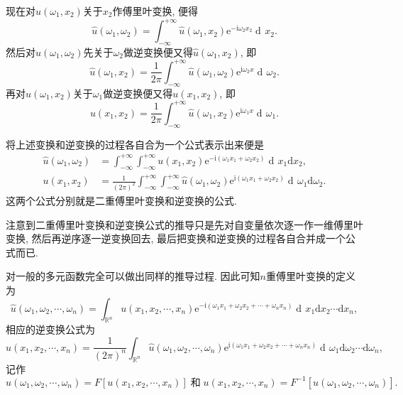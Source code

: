 \documentclass[aspectratio=169,notheorems,12pt,compress,UTF8]{ctexbeamer} %
\DeclareMathOperator\dif{d\!}
\def\R {\mathbb {R}}
\def\disp{\displaystyle}
\newcommand{\me}{\mathrm{e}}
\newcommand{\mi}{\mathrm{i}}
\newcommand{\spb}{\vspace{3mm}}
\begin{document}
\begin{frame}
现在对$\widehat{u}(\omega_1,x_2)$关于$x_2$作傅里叶变换, 便得
$$
\widehat{u}(\omega_1,\omega_2)=\int_{-\infty}^{+\infty}\widehat{u}(\omega_1,x_2)\me^{-\mi\omega_2x_2}\dif x_2.
$$
然后对$\widehat{u}(\omega_1,\omega_2)$先关于$\omega_2$做逆变换便又得$\widehat{u}(\omega_1,x_2)$, 即
\begin{equation*}
\widehat{u}(\omega_1,x_2)=\frac{1}{2\pi}\int_{-\infty}^{+\infty}\widehat{u}(\omega_1,\omega_2)\me^{\mi\omega_2
x}\dif\omega_2.
\end{equation*}
再对$\widehat{u}(\omega_1,x_2)$关于$\omega_1$做逆变换便又得$u(x_1,x_2)$, 即
\begin{equation*}
u(x_1,x_2)=\frac{1}{2\pi}\int_{-\infty}^{+\infty}\widehat{u}(\omega_1,x_2)\me^{\mi\omega_1
x}\dif\omega_1.
\end{equation*}
\end{frame}

\begin{frame}
将上述变换和逆变换的过程各自合为一个公式表示出来便是
\begin{align*}
\widehat{u}(\omega_1,\omega_2) &=\int_{-\infty}^{+\infty}\!\!\int_{-\infty}^{+\infty}u(x_1,x_2)
\me^{-\mi(\omega_1x_1+\omega_2x_2)}\dif x_1\mathrm{d} x_2,\\[3mm]
u(x_1,x_2) &=\frac{1}{(2\pi)^2}\int_{-\infty}^{+\infty}\!\!\int_{-\infty}^{+\infty}
\widehat{u}(\omega_1,\omega_2)\me^{\mi(\omega_1x_1+\omega_2x_2)}\dif\omega_1\mathrm{d}\omega_2.
\end{align*}
这两个公式分别就是二重傅里叶变换和逆变换的公式.\pause\spb

\qquad 注意到二重傅里叶变换和逆变换公式的推导只是先对自变量依次逐一作一维傅里叶变换,
然后再逆序逐一逆变换回去, 最后把变换和逆变换的过程各自合并成一个公式而已.
\end{frame}

\begin{frame}
\qquad 对一般的多元函数完全可以做出同样的推导过程. 因此可知$n$重傅里叶变换的定义为
$$
\widehat{u}(\omega_1,\omega_2,\cdots,\omega_n)
=\disp\int_{\R^n}u(x_1,x_2,\cdots,x_n)
\me^{-\mi(\omega_1x_1+\omega_2x_2+\cdots+\omega_nx_n)}\dif x_1\mathrm{d} x_2\cdots
\mathrm{d} x_n,
$$
相应的逆变换公式为
$$
u(x_1,x_2,\cdots,x_n)=\disp\frac{1}{(2\pi)^n}
\int_{\R^n}\widehat{u}(\omega_1,\omega_2,\cdots,\omega_n)
\me^{\mi(\omega_1x_1+\omega_2x_2+\cdots+\omega_nx_n)}\dif\omega_1\mathrm{d}\omega_2\cdots
\mathrm{d}\omega_n,
$$
记作
$$
\widehat{u}(\omega_1,\omega_2,\cdots,\omega_n)=F[u(x_1,x_2,\cdots,x_n)]\;\text{和}\;
u(x_1,x_2,\cdots,x_n)=F^{-1}[\widehat{u}(\omega_1,\omega_2,\cdots,\omega_n)].
$$
\end{frame}
\end{document}
